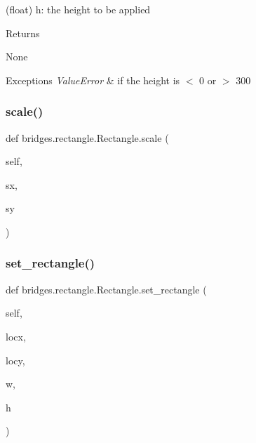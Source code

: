 \begin{DoxyVerb}       (float) h: the height to be applied
\end{DoxyVerb}
 \begin{DoxyReturn}{Returns}


None
\end{DoxyReturn}

\begin{DoxyExceptions}{Exceptions}
{\em Value\+Error} & if the height is $<$ 0 or $>$ 300 \\
\hline
\end{DoxyExceptions}
\mbox{\label{classbridges_1_1rectangle_1_1_rectangle_af540e714f768efb6142310047fffc8c7}} 
\subsubsection{\texorpdfstring{scale()}{scale()}}
{\footnotesize\ttfamily def bridges.\+rectangle.\+Rectangle.\+scale (\begin{DoxyParamCaption}\item[{}]{self,  }\item[{}]{sx,  }\item[{}]{sy }\end{DoxyParamCaption})}

\mbox{\label{classbridges_1_1rectangle_1_1_rectangle_a187376dcdc5c10c5b1ce5f3f00a80961}} 
\subsubsection{\texorpdfstring{set\_rectangle()}{set\_rectangle()}}
{\footnotesize\ttfamily def bridges.\+rectangle.\+Rectangle.\+set\+\_\+rectangle (\begin{DoxyParamCaption}\item[{}]{self,  }\item[{}]{locx,  }\item[{}]{locy,  }\item[{}]{w,  }\item[{}]{h }\end{DoxyParamCaption})}



